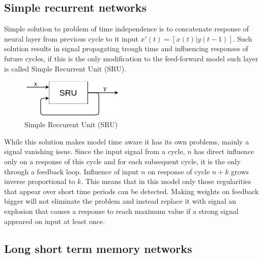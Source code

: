 \subsection{Simple recurrent networks}
Simple solution to problem of time independence is to concatenate response of neural layer
from previous cycle to it input $x'(t)=[x(t)|y(t-1)]$.
Such solution results in signal propagating trough time and influencing responses of future cycles,
if this is the only modification to the feed-forward model such layer is called Simple Recurrent
Unit (SRU).
\begin{figure}[h] 
	\centering
	\includegraphics[width=5cm]{res/sru}
	\caption{Simple Reccurent Unit (SRU)}
	\label{fig:sru}
\end{figure}
While this solution makes model time aware it has its own problems, mainly a signal vanishing
issue. Since the input signal from a cycle, $n$ has direct influence only on a response of this
cycle and for each subsequent cycle, it is the only through a feedback loop.
Influence of input $n$ on response of cycle $n+k$ grows inverse proportional to $k$.
This means that in this model only those regularities that appear over short time periods can
be detected.
Making weights on feedback bigger will not eliminate the problem and instead replace it with signal
an explosion that causes a response to reach maximum value if a strong signal appeared on input at
least once.

\subsection{Long short term memory networks}
